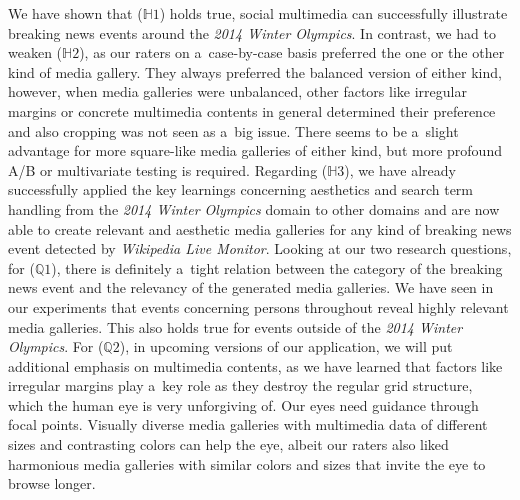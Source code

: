 \documentclass{sig-alternate}
\begin{document}
We have shown that ($\mathbb{H}1$) holds true,
social multimedia can successfully illustrate breaking news events
around the \emph{2014 Winter Olympics}.
In contrast, we had to weaken ($\mathbb{H}2$),
as our raters on a~case-by-case basis preferred
the one or the other kind of media gallery.
They always preferred the balanced version of either kind,
however, when media galleries were unbalanced,
other factors like irregular margins or
concrete multimedia contents in general determined their preference
and also cropping was not seen as a~big issue.
There seems to be a~slight advantage
for more square-like media galleries of either kind,
but more profound A/B or multivariate testing is required.
Regarding ($\mathbb{H}3$), we have already successfully
applied the key learnings concerning aesthetics
and search term handling from the \emph{2014 Winter Olympics} domain
to other domains and are now able to create relevant and aesthetic
media galleries for any kind of breaking news event
detected by \emph{Wikipedia Live Monitor}. 
Looking at our two research questions, for ($\mathbb{Q}1$),
there is definitely a~tight relation
between the category of the breaking news event
and the relevancy of the generated media galleries.
We have seen in our experiments that events concerning persons
throughout reveal highly relevant media galleries.
This also holds true for events outside of the \emph{2014 Winter Olympics}.
For ($\mathbb{Q}2$), in upcoming versions of our application,
we will put additional emphasis on multimedia contents,
as we have learned that factors like irregular margins play
a~key role as they destroy the regular grid structure,
which the human eye is very unforgiving of.
Our eyes need guidance through focal points.
Visually diverse media galleries with multimedia data
of different sizes and contrasting colors can help the eye,
albeit our raters also liked harmonious media galleries
with similar colors and sizes that invite the eye to browse longer.
\end{document}
